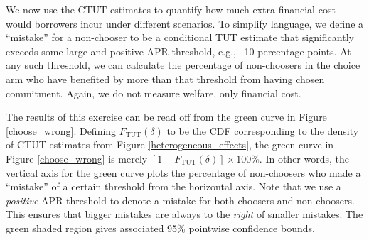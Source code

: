 \documentclass[12pt, a4paper]{article}
\begin{document}
We now use the CTUT estimates to quantify how much extra financial cost would borrowers incur under different scenarios. To simplify language, we define a ``mistake'' for a non-chooser to be a conditional TUT estimate that significantly exceeds some large and positive APR threshold, e.g., \ 10 percentage points. 
At any such threshold, we can calculate the percentage of non-choosers in the choice arm who have benefited by more than that threshold from having chosen commitment. Again, we do not measure welfare, only financial cost.


The results of this exercise can be read off from the green curve in Figure \ref{choose_wrong}.
Defining $F_{\text{TUT}}(\delta)$ to be the CDF corresponding to the density of  CTUT estimates from Figure \ref{heterogeneous_effects}, the green curve in Figure \ref{choose_wrong} is merely $[1 - F_{\text{TUT}}(\delta)] \times 100\%$.
In other words, the vertical axis for the green curve plots the percentage of non-choosers who made a ``mistake'' of a certain threshold from the horizontal axis. Note that we use a \emph{positive} APR threshold to denote a mistake for both choosers and non-choosers.  This ensures that bigger mistakes are always to the \emph{right} of smaller mistakes. 
The green shaded region gives associated 95\% pointwise confidence bounds.
\end{document}
